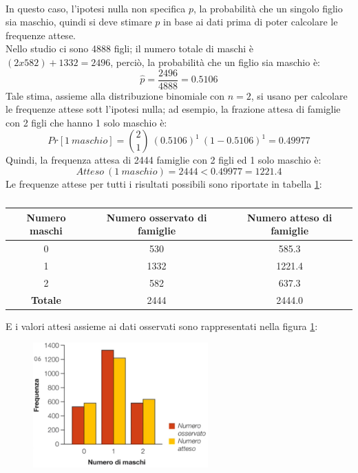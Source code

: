 \documentclass[10pt, draft]{book}
\newcounter{example}[section]
\begin{document}
\begin{example}
    \\
    In questo caso, l'ipotesi nulla non specifica $p$, la probabilità che un singolo figlio sia maschio, quindi si deve stimare $p$ in base ai dati prima di poter calcolare le frequenze attese.
    \\
    Nello studio ci sono 4888 figli; il numero totale di maschi è $(2 x 582) + 1332 = 2496$, perciò, la probabilità che un figlio sia maschio è:
    \begin{equation}
    \hat{p} = \frac{2496}{4888} = 0.5106
    \end{equation}
    Tale stima, assieme alla distribuzione binomiale con $n = 2$, si usano per calcolare le frequenze attese sott l'ipotesi nulla; ad esempio, la frazione attesa di famiglie con 2 figli che hanno 1 solo maschio è:
    \begin{equation}
    Pr[1\ maschio] = \binom{2}{1}\ (0.5106)^1\ (1-0.5106)^1 = 0.49977
    \end{equation}
    Quindi, la frequenza attesa di 2444 famiglie con 2 figli ed 1 solo maschio è:
    \begin{equation}
    Atteso\ (1\ maschio) = 2444 < 0.49977 = 1221.4
    \end{equation}
    Le frequenze attese per tutti i risultati possibili sono riportate in tabella \ref{tabmaschi2}:
    \begin{table}[H]
        \centering
        \renewcommand\arraystretch{1.2}
        \begin{tabular}{c|c|c}
        \hline
        \textbf{Numero maschi} & \textbf{Numero osservato di famiglie} & \textbf{Numero atteso di famiglie}\\
        \hline
        0 & 530 & 585.3\\
        1 & 1332 & 1221.4\\
        2 & 582 & 637.3\\
        \hline
        \textbf{Totale} & 2444 & 2444.0\\
        \hline
        \end{tabular}
        \caption{}
        \label{tabmaschi2}
    \end{table}\noindent
    E i valori attesi assieme ai dati osservati sono rappresentati nella figura \ref{fig8.5-1}:
    \begin{figure}[H]\label{fig8.5-1}
    \centering
    \includegraphics[width=0.6\textwidth]{fig8.5-1}

\end{figure}
\end{example}
\end{document}
